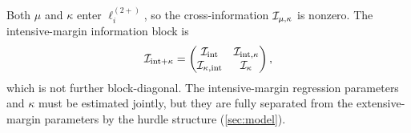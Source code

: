 
\begin{remark}\label{smb:rem-cross-info}
  Both $\mu$ and $\kappa$ enter $\ell_i^{(2+)}$, so the
  cross-information $\mathcal{I}_{\mu,\kappa}$ is nonzero.
  The intensive-margin information block is
  \begin{equation}\label{smb:eq-info-block}
    \mathcal{I}_{\textup{int}+\kappa}
    = \begin{pmatrix}
        \mathcal{I}_{\textup{int}}   & \mathcal{I}_{\textup{int},\kappa} \\
        \mathcal{I}_{\kappa,\textup{int}} & \mathcal{I}_{\kappa}
      \end{pmatrix},
  \end{equation}
  which is not further block-diagonal.  The intensive-margin regression
  parameters and $\kappa$ must be estimated jointly, but they are fully
  separated from the extensive-margin parameters by the hurdle structure
  (\cref{sec:model}).
\end{remark}

